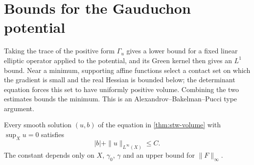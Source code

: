 \section{Bounds for the Gauduchon potential}
\label{sec:stw-czero}

Taking the trace of the positive form $\Gamma_u$ gives a lower bound for a fixed linear elliptic operator applied to the potential, and its Green kernel then gives an $L^1$ bound. Near a minimum, supporting affine functions select a contact set on which the gradient is small and the real Hessian is bounded below; the determinant equation forces this set to have uniformly positive volume. Combining the two estimates bounds the minimum. This is an Alexandrov--Bakelman--Pucci type argument.

\begin{proposition}\label{prop:stw-czero-reconstructed}
Every smooth solution $(u,b)$ of the equation in \cref{thm:stw-volume} with $\sup_Xu=0$ satisfies
\[
 |b|+\|u\|_{L^\infty(X)}\leq C.
\]
The constant depends only on $X$, $\gamma_0$, $\gamma$ and an upper bound for $\|F\|_\infty$.
\end{proposition}
